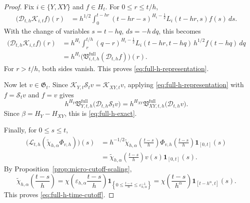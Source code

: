 \documentclass[11pt,a4paper]{amsart}
\theoremstyle{plain}
\theoremstyle{definition}
\theoremstyle{remark}
\newcommand{\one}{\mathbf 1}
\begin{document}
\begin{proof}
Fix \(i\in\{Y,XY\}\) and \(f\in H_t\). For \(0\le r\le t/h\),
\begin{align*}
\bigl(\mathcal D_{t,h}\mathcal K_{i,t}f\bigr)(r)
&=
h^{1/2}
\int_0^{t-hr}
(t-hr-s)^{H_i-\frac12}
L_i(t-hr,s)f(s)\,ds.
\end{align*}
With the change of variables \(s=t-hq\), \(ds=-h\,dq\), this becomes
\begin{align*}
\bigl(\mathcal D_{t,h}\mathcal K_{i,t}f\bigr)(r)
&=
h^{H_i}
\int_r^{t/h}
(q-r)^{H_i-\frac12}
L_i(t-hr,t-hq)\,
h^{1/2}f(t-hq)\,dq \\
&=
h^{H_i}
\bigl(
\mathfrak V_{i,t,h}^{\mathrm{full}}(\mathcal D_{t,h}f)
\bigr)(r).
\end{align*}
For \(r>t/h\), both sides vanish. This proves \eqref{eq:full-h-representation}.

Now let \(v\in\mathfrak G_t\). Since \(\mathcal K_{Y,t}\mathcal S_t v=\mathcal K_{XY,t}v\), applying
\eqref{eq:full-h-representation} with \(f=\mathcal S_t v\) and \(f=v\) gives
\[
h^{H_Y}
\mathfrak V_{Y,t,h}^{\mathrm{full}}
\bigl(
\mathcal D_{t,h}\mathcal S_t v
\bigr)
=
h^{H_{XY}}
\mathfrak V_{XY,t,h}^{\mathrm{full}}
\bigl(
\mathcal D_{t,h}v
\bigr).
\]
Since \(\beta=H_Y-H_{XY}\), this is \eqref{eq:full-h-exact}.

Finally, for \(0\le s\le t\),
\begin{align*}
\bigl(
\mathcal L_{t,h}
(\widetilde\chi_{h,\alpha}\Phi_{v,h})
\bigr)(s)
&=
h^{-1/2}
\widetilde\chi_{h,\alpha}\!\left(\frac{t-s}{h}\right)
\Phi_{v,h}\!\left(\frac{t-s}{h}\right)\one_{[0,t]}(s) \\
&=
\widetilde\chi_{h,\alpha}\!\left(\frac{t-s}{h}\right)
v(s)\one_{[0,t]}(s).
\end{align*}
By Proposition~\ref{prop:micro-cutoff-scaling},
\[
\widetilde\chi_{h,\alpha}\!\left(\frac{t-s}{h}\right)
=
\chi\!\left(
\varepsilon_{h,\alpha}\frac{t-s}{h}
\right)
\one_{\left\{0\le \frac{t-s}{h}\le \varepsilon_{h,\alpha}^{-1}\right\}}
=
\chi\!\left(\frac{t-s}{h^\alpha}\right)\one_{[t-h^\alpha,t]}(s).
\]
This proves \eqref{eq:full-h-time-cutoff}.
\end{proof}
\end{document}
